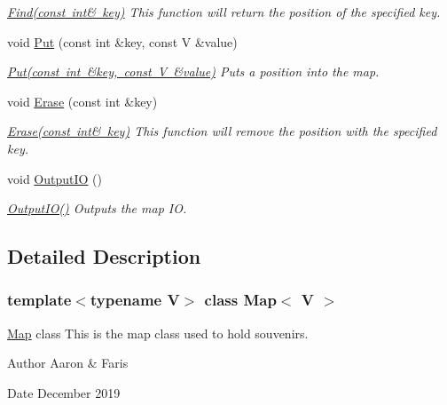 \begin{DoxyCompactItemize}
\begin{DoxyCompactList}\small\item\em \mbox{\hyperlink{class_map_a5a4498cca2ab6536d04915f07ca5f01f}{Find(const int\& key)}} This function will return the position of the specified key. \end{DoxyCompactList}\item 
void \mbox{\hyperlink{class_map_acc047d86867d1093a12c152aaa99dff2}{Put}} (const int \&key, const V \&value)
\begin{DoxyCompactList}\small\item\em \mbox{\hyperlink{class_map_acc047d86867d1093a12c152aaa99dff2}{Put(const int \&key, const V \&value)}} Puts a position into the map. \end{DoxyCompactList}\item 
void \mbox{\hyperlink{class_map_a6ab297193740409c74ad10cfb9116e8b}{Erase}} (const int \&key)
\begin{DoxyCompactList}\small\item\em \mbox{\hyperlink{class_map_a6ab297193740409c74ad10cfb9116e8b}{Erase(const int\& key)}} This function will remove the position with the specified key. \end{DoxyCompactList}\item 
void \mbox{\hyperlink{class_map_a2f04ee3a341608930df81062df179453}{Output\+IO}} ()
\begin{DoxyCompactList}\small\item\em \mbox{\hyperlink{class_map_a2f04ee3a341608930df81062df179453}{Output\+I\+O()}} Outputs the map IO. \end{DoxyCompactList}\end{DoxyCompactItemize}


\subsection{Detailed Description}
\subsubsection*{template$<$typename V$>$\newline
class Map$<$ V $>$}

\mbox{\hyperlink{class_map}{Map}} class This is the map class used to hold souvenirs. 

\begin{DoxyAuthor}{Author}
Aaron \& Faris 
\end{DoxyAuthor}
\begin{DoxyDate}{Date}
December 2019 
\end{DoxyDate}



